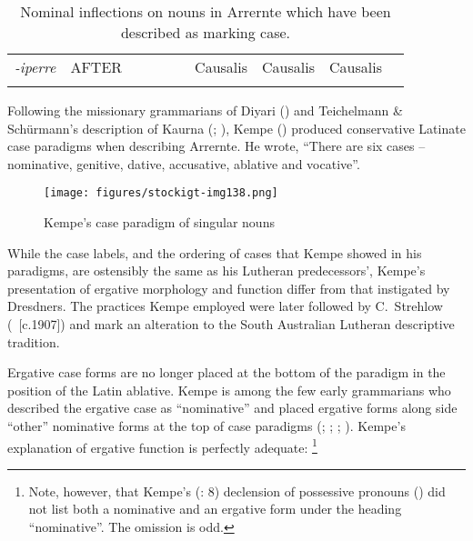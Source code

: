 \begin{sidewaystable}
\begin{tabularx}{\textwidth}{QQQQQQQQQQ}
 \textit{{}-iperre}
 & AFTER &  &  &  &  & {Causalis}
 & {Causalis}
 & {Causalis}
 & \\
\lspbottomrule
\end{tabularx}
\caption{Nominal inflections on nouns in Arrernte which have been described as marking case.}
\label{bkm:Ref456347505}
\label{tab:key:9-191}
\label{fig:key:191}
\end{sidewaystable}


Following the missionary grammarians of Diyari () and Teichelmann \& Schürmann’s description of Kaurna (\citeyear{teichelmann_outlines_1840}; ), Kempe () produced conservative Latinate case paradigms when describing Arrernte. He \citeyearpar[3]{kempe_grammar_1891} wrote, “There are six cases – nominative, genitive, dative, accusative, ablative and vocative”.


\begin{figure}
\texttt{[image: figures/stockigt-img138.png]}
\caption{Kempe’s case paradigm of singular nouns \citeyearpar[3]{kempe_grammar_1891}}
\label{bkm:Ref456021315}\label{fig:key:9-192}
\end{figure}

While the case labels, and the ordering of cases that Kempe showed in his paradigms, are ostensibly the same as his Lutheran predecessors’, Kempe’s presentation of ergative morphology and function differ from that instigated by Dresdners. The practices Kempe employed were later followed by C.~Strehlow (\citeyear{strehlow_untitled_1931}~[c.1907]) and mark an alteration to the South Australian Lutheran descriptive tradition.

\largerpage
Ergative case forms are no longer placed at the bottom of the paradigm in the position of the Latin ablative. Kempe is among the few early grammarians who described the ergative case as “nominative” and placed ergative forms along side “other” nominative forms at the top of case paradigms (\citealt{symmons_grammatical_1841}; \citealt{roth_ethnological_1897}; \citealt{ray_linguistics_1907}; ). Kempe’s explanation of ergative function is perfectly adequate: \footnote{Note, however, that Kempe’s (\citeyear{kempe_grammar_1891}: 8) declension of possessive pronouns () did not list both a nominative and an ergative form under the heading ``nominative''. The omission is odd.}
\clearpage

